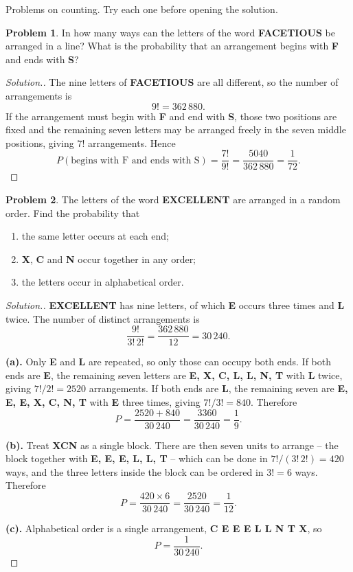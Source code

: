 \documentclass[12pt,a4paper]{report}
\theoremstyle{definition}
\theoremstyle{plain}
\theoremstyle{definition}
\newtheorem{problemx}{Problem}[section]
\newenvironment{problem}{\begin{problemx}}{\end{problemx}}
\newenvironment{solution}
  {\renewcommand{\qedsymbol}{}\begin{proof}[\textit{Solution}.]}
  {\end{proof}}
\begin{document}
Problems on counting. Try each one before opening the solution.

\begin{problem}
In how many ways can the letters of the word \textbf{FACETIOUS} be arranged in a
line? What is the probability that an arrangement begins with \textbf{F} and
ends with \textbf{S}?
\end{problem}

\begin{solution}
The nine letters of \textbf{FACETIOUS} are all different, so the number of
arrangements is \[9! = 362\,880.\]
If the arrangement must begin with \textbf{F} and end with \textbf{S}, those two
positions are fixed and the remaining seven letters may be arranged freely in
the seven middle positions, giving $7!$ arrangements. Hence
\[P(\text{begins with F and ends with S}) = \frac{7!}{9!} = \frac{5040}{362\,880} = \frac{1}{72}.\]
\end{solution}

\begin{problem}
The letters of the word \textbf{EXCELLENT} are arranged in a random order. Find
the probability that
\begin{enumerate}
\item[(a).] the same letter occurs at each end;
\item[(b).] \textbf{X}, \textbf{C} and \textbf{N} occur together in any order;
\item[(c).] the letters occur in alphabetical order.
\end{enumerate}
\end{problem}

\begin{solution}
\textbf{EXCELLENT} has nine letters, of which \textbf{E} occurs three times and
\textbf{L} twice. The number of distinct arrangements is
\[\frac{9!}{3!\,2!} = \frac{362\,880}{12} = 30\,240.\]

\textbf{(a).} Only \textbf{E} and \textbf{L} are repeated, so only those can
occupy both ends. If both ends are \textbf{E}, the remaining seven letters are
\textbf{E, X, C, L, L, N, T} with \textbf{L} twice, giving $7!/2! = 2520$
arrangements. If both ends are \textbf{L}, the remaining seven are
\textbf{E, E, E, X, C, N, T} with \textbf{E} three times, giving $7!/3! = 840$.
Therefore
\[P = \frac{2520 + 840}{30\,240} = \frac{3360}{30\,240} = \frac{1}{9}.\]

\textbf{(b).} Treat \textbf{XCN} as a single block. There are then seven units
to arrange -- the block together with \textbf{E, E, E, L, L, T} -- which can be
done in $7!/(3!\,2!) = 420$ ways, and the three letters inside the block can be
ordered in $3! = 6$ ways. Therefore
\[P = \frac{420 \times 6}{30\,240} = \frac{2520}{30\,240} = \frac{1}{12}.\]

\textbf{(c).} Alphabetical order is a single arrangement,
\textbf{C E E E L L N T X}, so
\[P = \frac{1}{30\,240}.\]
\end{solution}
\end{document}
